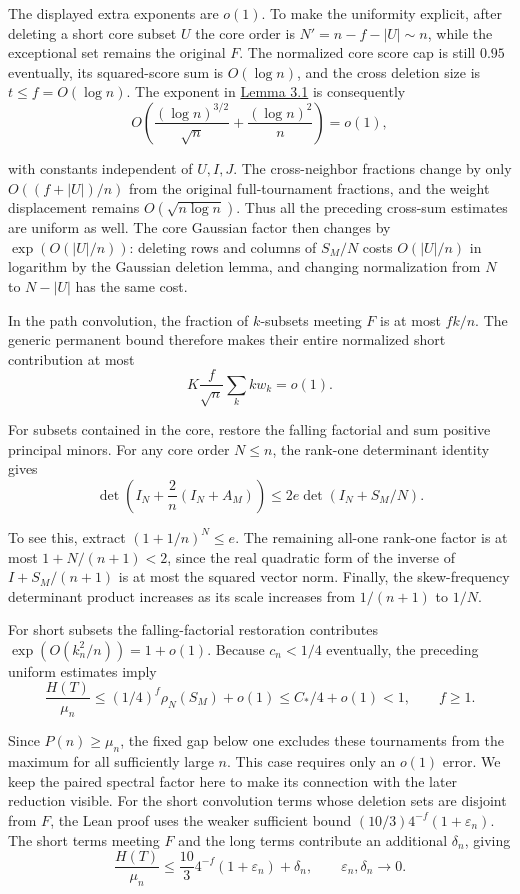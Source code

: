 \documentclass[11pt,a4paper]{article}
\newcommand{\paperref}[2]{\hyperref[#1]{#2}}
\begin{document}
The displayed extra exponents are \(o(1)\). To make the uniformity explicit, after deleting a short core subset \(U\) the core order is \(N'=n-f-|U|\sim n\), while the exceptional set remains the original \(F\). The normalized core score cap is still \(0.95\) eventually, its squared-score sum is \(O(\log n)\), and the cross deletion size is \(t\le f=O(\log n)\). The exponent in \paperref{thm-3.1}{Lemma 3.1} is consequently
\[O\!\left(\frac{(\log n)^{3/2}}{\sqrt n}+\frac{(\log n)^2}{n}\right)=o(1),\]

with constants independent of \(U,I,J\). The cross-neighbor fractions change by only \(O((f+|U|)/n)\) from the original full-tournament fractions, and the weight displacement remains \(O(\sqrt{n\log n})\). Thus all the preceding cross-sum estimates are uniform as well. The core Gaussian factor then changes by \(\exp(O(|U|/n))\): deleting rows and columns of \(S_M/N\) costs \(O(|U|/n)\) in logarithm by the Gaussian deletion lemma, and changing normalization from \(N\) to \(N-|U|\) has the same cost.

In the path convolution, the fraction of \(k\)-subsets meeting \(F\) is at most \(fk/n\). The generic permanent bound therefore makes their entire normalized short contribution at most
\[K\frac{f}{\sqrt n}\sum_k k w_k=o(1).\]

For subsets contained in the core, restore the falling factorial and sum positive principal minors. For any core order \(N\le n\), the rank-one determinant identity gives
\[\det\left(I_N+\frac2n(I_N+A_M)\right)
\le2e\det(I_N+S_M/N).\]

To see this, extract \((1+1/n)^N\le e\). The remaining all-one rank-one factor is at most \(1+N/(n+1)<2\), since the real quadratic form of the inverse of \(I+S_M/(n+1)\) is at most the squared vector norm. Finally, the skew-frequency determinant product increases as its scale increases from \(1/(n+1)\) to \(1/N\).

For short subsets the falling-factorial restoration contributes \(\exp(O(k_n^2/n))=1+o(1)\). Because \(c_n<1/4\) eventually, the preceding uniform estimates imply
\[\frac{H(T)}{\mu_n}
\le(1/4)^f\rho_N(S_M)+o(1)
\le C_*/4+o(1)<1,\qquad f\ge1.\]

Since \(P(n)\ge\mu_n\), the fixed gap below one excludes these tournaments from the maximum for all sufficiently large \(n\). This case requires only an \(o(1)\) error. We keep the paired spectral factor here to make its connection with the later reduction visible. For the short convolution terms whose deletion sets are disjoint from \(F\), the Lean proof uses the weaker sufficient bound \((10/3)4^{-f}(1+\varepsilon_n)\). The short terms meeting \(F\) and the long terms contribute an additional \(\delta_n\), giving
\begin{equation}
\frac{H(T)}{\mu_n}\le\frac{10}{3}4^{-f}(1+\varepsilon_n)+\delta_n,
\qquad \varepsilon_n,\delta_n\longrightarrow0.
\tag{3.1}\label{eq-exceptional-bound}
\end{equation}
\end{document}
